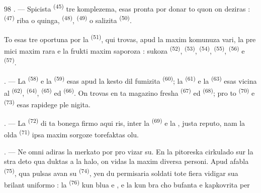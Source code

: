 \begin{VUpage}[100]{98}
. --- Spicista  \textsuperscript{(45)} tre komplezema,\nl
esas pronta por donar to quon on deziras :\nl
{} \textsuperscript{(47)} riba o quinga,  \textsuperscript{(48)}, \cc
{} \textsuperscript{(49)} o salizita  \textsuperscript{(50)}.

\VUblancAlinea
To esas tre oportuna por la  \textsuperscript{(51)}, qui\nl
trovas, apud la maxim komunuza vari, la pre\cc
mici maxim rara e la frukti maxim saporoza :\nl
sukoza  \textsuperscript{(52)},  \textsuperscript{(53)},  \textsuperscript{(54)}, \cc
{} \textsuperscript{(55)},  \textsuperscript{(56)} e  \textsuperscript{(57)}.

\VUsaut{4.0mm}
\VUsaut{3.0mm}

. --- La  \textsuperscript{(58)} e la  \textsuperscript{(59)} esas apud\nl
la kesto dil fumizita  \textsuperscript{(60)}; la  \textsuperscript{(61)}\nl
e la  \textsuperscript{(63)} esas vicina al  \textsuperscript{(62)},  \textsuperscript{(64)},\nl
{} \textsuperscript{(65)} ed  \textsuperscript{(66)}. On trovas en ta\nl
magazino fresha  \textsuperscript{(67)} ed  \textsuperscript{(68)}; pro to\nl
{} \textsuperscript{(70)} e  \textsuperscript{(73)} esas rapidege ple\cc
nigita.

. --- La  \textsuperscript{(72)} di ta bonega firmo aqui\cc
ris, inter la  \textsuperscript{(69)} e la , justa\nl
reputo, nam la olda  \textsuperscript{(71)} ipsa maxim\nl
sorgoze torefaktas olu.

\VUsaut{4.0mm}
\VUsaut{3.0mm}

. --- Ne omni adiras la merkato por pro\cc
vizar su. En la pitoreska cirkulado sur la stra\cc
deto qua duktas a la halo, on vidas la maxim\nl
diversa personi. Apud afabla \cc
{} \textsuperscript{(75)}, qua pulsas avan su  \textsuperscript{(74)}, yen du\nl
permisaria soldati tote fiera vidigar sua brilant\nl
uniformo : la  \textsuperscript{(76)} kun blua  e\nl
{}, e la  kun bra\cc
cho bufanta e kapkovrita per 
\end{VUpage}

